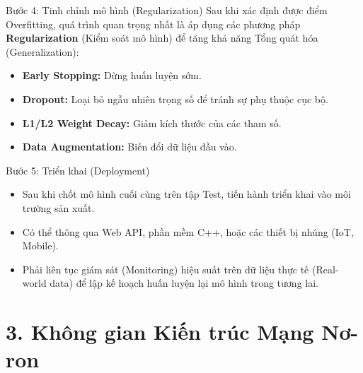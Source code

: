 \documentclass[aspectratio=169]{beamer}
\begin{document}
\begin{frame}{Bước 4: Tinh chỉnh mô hình (Regularization)}
    Sau khi xác định được điểm Overfitting, quá trình quan trọng nhất là áp dụng các phương pháp \textbf{Regularization} (Kiểm soát mô hình) để tăng khả năng Tổng quát hóa (Generalization):
    \begin{itemize}
        \item \textbf{Early Stopping:} Dừng huấn luyện sớm.
        \item \textbf{Dropout:} Loại bỏ ngẫu nhiên trọng số để tránh sự phụ thuộc cục bộ.
        \item \textbf{L1/L2 Weight Decay:} Giảm kích thước của các tham số.
        \item \textbf{Data Augmentation:} Biến đổi dữ liệu đầu vào.
    \end{itemize}
\end{frame}

\begin{frame}{Bước 5: Triển khai (Deployment)}
    \begin{itemize}
        \item Sau khi chốt mô hình cuối cùng trên tập Test, tiến hành triển khai vào môi trường sản xuất.
        \item Có thể thông qua Web API, phần mềm C++, hoặc các thiết bị nhúng (IoT, Mobile).
        \item Phải liên tục giám sát (Monitoring) hiệu suất trên dữ liệu thực tế (Real-world data) để lập kế hoạch huấn luyện lại mô hình trong tương lai.
    \end{itemize}
\end{frame}

\section{3. Không gian Kiến trúc Mạng Nơ-ron}
\end{document}

